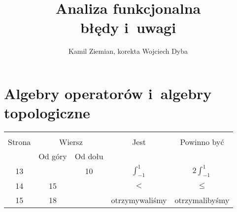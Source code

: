 \documentclass[a4paper,11pt]{article}
\title{Analiza funkcjonalna \\
  błędy i~uwagi}
\author{Kamil Ziemian, korekta Wojciech Dyba}
\begin{document}





\maketitle %





\section{Algebry operatorów i~algebry topologiczne}

\vspace{\spaceTwo}








\begin{center}

  \begin{tabular}{|c|c|c|c|c|}
    \hline
    & \multicolumn{2}{c|}{} & & \\
    Strona & \multicolumn{2}{c|}{Wiersz} & Jest
                              & Powinno być \\ \cline{2-3}
    & Od góry & Od dołu & & \\
    \hline
    13  & & 10 & $\int^{ 1 }_{ -1 }$ & $2 \int^{ 1 }_{ -1 }$ \\
    14  & 15 & & $<$ & $\leq$ \\
    15  & 18 & & otrzymywaliśmy & otrzymalibyśmy \\
    \hline
  \end{tabular}

\end{center}

\vspace{\spaceTwo}
\end{document}
